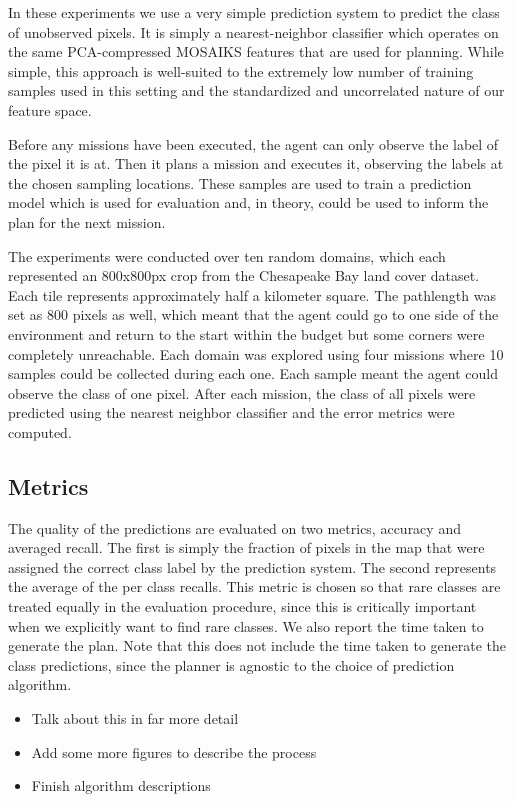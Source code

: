 In these experiments we use a very simple prediction system to predict the class of unobserved pixels. It is simply a nearest-neighbor classifier which operates on the same PCA-compressed MOSAIKS features that are used for planning. While simple, this approach is well-suited to the extremely low number of training samples used in this setting and the standardized and uncorrelated nature of our feature space.

Before any missions have been executed, the agent can only observe the label of the pixel it is at. Then it plans a mission and executes it, observing the labels at the chosen sampling locations. These samples are used to train a prediction model which is used for evaluation and, in theory, could be used to inform the plan for the next mission. 


The experiments were conducted over ten random domains, which each represented an 800x800px crop from the Chesapeake Bay land cover dataset. Each tile represents approximately half a kilometer square. The pathlength was set as 800 pixels as well, which meant that the agent could go to one side of the environment and return to the start within the budget but some corners were completely unreachable. Each domain was explored using four missions where 10 samples could be collected during each one. Each sample meant the agent could observe the class of one pixel. After each mission, the class of all pixels  were predicted using the nearest neighbor classifier and the error metrics were computed. 


\subsection{Metrics}
The quality of the predictions are evaluated on two metrics, accuracy and averaged recall. The first is simply the fraction of pixels in the map that were assigned the correct class label by the prediction system. The second represents the average of the per class recalls. This metric is chosen so that rare classes are treated equally in the evaluation procedure, since this is critically important when we explicitly want to find rare classes. We also report the time taken to generate the plan. Note that this does not include the time taken to generate the class predictions, since the planner is agnostic to the choice of prediction algorithm.

 
 \begin{itemize}
     \item Talk about this in far more detail
     \item Add some more figures to describe the process
     \item Finish algorithm descriptions
 \end{itemize}